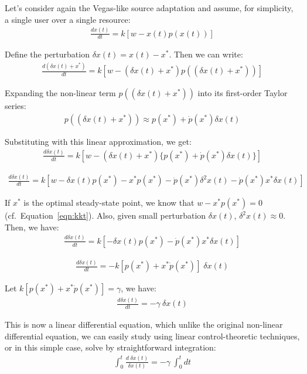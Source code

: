 \documentclass{article}
\begin{document}
Let's consider again the Vegas-like source adaptation and assume, for simplicity, a single user over a single resource:
\begin{eqnarray*}
\frac{d x(t)}{dt} = k [w - x(t) p(x(t))]
\end{eqnarray*}

Define the perturbation $\delta x(t) = x(t) - x^*$. Then we can write:
\begin{eqnarray*}
\frac{d (\delta x(t) + x^*)}{dt} = k [w - (\delta x(t) + x^*) p((\delta x(t) + x^*))]
\end{eqnarray*}

Expanding the non-linear term $p((\delta x(t) + x^*))$ into its first-order Taylor series:
\begin{eqnarray*}
p((\delta x(t) + x^*)) \approx p(x^*) + \dot{p}(x^*) \delta x(t)
\end{eqnarray*}

Substituting with this linear approximation, we get:
\begin{eqnarray*}
\frac{d \delta x(t)}{dt} = k [w - (\delta x(t) + x^*) \{p(x^*) + \dot{p}(x^*) \delta x(t)\}]
\end{eqnarray*}

\begin{eqnarray*}
\frac{d \delta x(t)}{dt} = k [w - \delta x(t) p(x^*) - x^* p(x^*) - \dot{p}(x^*) \delta^2 x(t) - \dot{p}(x^*) x^* \delta x(t)]
\end{eqnarray*}

If $x^*$ is the optimal steady-state point, we know that $w - x^* p(x^*) = 0$ (cf.\ Equation~\ref{eqn:kkt}). 
Also, given small perturbation $\delta x(t)$, $\delta^2 x(t) \approx 0$.
Then, we have:
\begin{eqnarray*}
\frac{d \delta x(t)}{dt} = k [ - \delta x(t) p(x^*)  - \dot{p}(x^*) x^* \delta x(t)]
\end{eqnarray*}

\begin{eqnarray*}
\frac{d \delta x(t)}{dt} = -k [p(x^*)  + x^* \dot{p}(x^*) ]\; \delta x(t)
\end{eqnarray*}

Let $k[p(x^*)  + x^* \dot{p}(x^*)] = \gamma$, we have:
\begin{eqnarray}
\frac{d \delta x(t)}{dt} = - \gamma\ \delta x(t)
\label{eqn:linearized}
\end{eqnarray}

This is now a linear differential equation, which unlike the original non-linear differential equation,
we can easily study using linear control-theoretic techniques, or
in this simple case, solve by straightforward integration:
\begin{eqnarray*}
\int_{0}^{t} \frac{d\; \delta x(t)}{\delta x(t)} = - \gamma\ \int_{0}^{t} dt
\end{eqnarray*}
\end{document}
